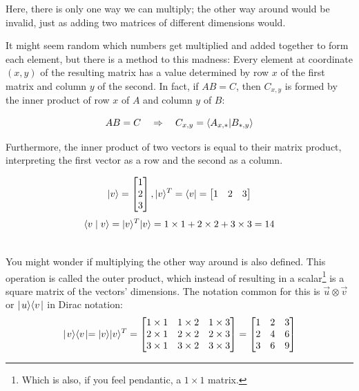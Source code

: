 Here, there is only one way we can multiply; the other way around would be invalid, just as adding two matrices of different dimensions would.

It might seem random which numbers get multiplied and added together to form each element, but there is a method to this madness: Every element at coordinate $(x,y)$ of the resulting matrix has a value determined by row $x$ of the first matrix and column $y$ of the second. In fact, if $AB = C$, then $C_{x,y}$ is formed by the inner product of row $x$ of $A$ and column $y$ of $B$:

  $$AB = C \quad\Rightarrow\quad C_{x,y} = \bra{A_{x,*}}\ket{B_{*,y}}$$

Furthermore, the inner product of two vectors is equal to their matrix product, interpreting the first vector as a row and the second as a column.

$$\vert v\rangle = \begin{bmatrix} 1 \\ 2 \\ 3 \end{bmatrix}, \vert v\rangle ^ T = \bra v = \begin{bmatrix} 1 & 2 & 3 \end{bmatrix}$$
$$\langle v \mid v \rangle = \vert v\rangle^T \vert v\rangle = 1\times1 + 2\times 2 + 3\times 3 = 14 $$

\begin{aside}\mbox{}\\
  You might wonder if multiplying the other way around is also defined. This operation is called the outer product, which instead of resulting in a scalar\footnote{Which is also, if you feel pendantic, a $1\times 1$ matrix.} is a square matrix of the vectors' dimensions. The notation common for this is $\vec u \otimes \vec v$ or $\mid\! u \rangle \langle v \!\mid$ in Dirac notation:
$$\mid\! v \rangle \langle v \!\mid = \vert v\rangle \vert v\rangle^T = \begin{bmatrix} 1\times 1 & 1 \times 2 & 1 \times 3 \\ 2 \times 1 & 2 \times 2 & 2 \times 3 \\ 3 \times 1 & 3 \times 2 & 3 \times 3 \end{bmatrix} = \begin{bmatrix} 1 & 2 & 3 \\ 2 & 4 & 6 \\ 3 & 6 & 9 \end{bmatrix}$$
\end{aside}


